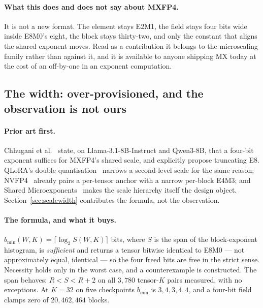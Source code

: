 \documentclass[11pt]{article}
\theoremstyle{definition}
\begin{document}
\paragraph{What this does and does not say about MXFP4.} It is not a new
format. The element stays E2M1, the field stays four bits wide inside E8M0's
eight, the block stays thirty-two, and only the constant that aligns the shared
exponent moves. Read as a contribution it belongs to the microscaling family
rather than against it, and it is available to anyone shipping MX today at the
cost of an off-by-one in an exponent computation.

\subsection*{The width: over-provisioned, and the observation is not ours}

\paragraph{Prior art first.} Chhugani et al.~\cite{chhugani} state, on
Llama-3.1-8B-Instruct and Qwen3-8B, that a four-bit exponent suffices for
MXFP4's shared scale, and explicitly propose truncating E8. QLoRA's double
quantisation~\cite{qlora} narrows a second-level scale for the same reason;
NVFP4~\cite{nvfp4} already pairs a per-tensor anchor with a narrow per-block
E4M3; and Shared Microexponents~\cite{msfp} makes the scale hierarchy itself
the design object. Section~\ref{sec:scalewidth} contributes the formula, not
the observation.

\paragraph{The formula, and what it buys.} $b_{\min}(W,K) = \lceil \log_{2}
S(W,K) \rceil$ bits, where $S$ is the span of the block-exponent histogram, is
\emph{sufficient} and returns a tensor bitwise identical to E8M0 --- not
approximately equal, identical --- so the four freed bits are free in the
strict sense. Necessity holds only in the worst case, and a counterexample is
constructed. The span behaves: $R < S < R+2$ on all $3{,}780$ tensor-$K$ pairs
measured, with no exceptions. At $K=32$ on five checkpoints $b_{\min}$ is
$3,4,3,4,4$, and a four-bit field clamps zero of $20{,}462{,}464$ blocks.
\end{document}
